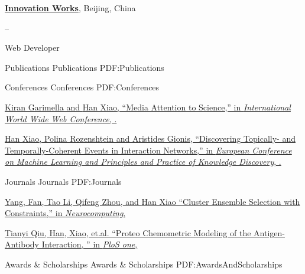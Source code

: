 \documentclass[letterpaper,MMMyyyy,nonstopmode]{simpleresumecv}
\begin{document}
\begin{Body}
\Entry
\href{http://www.example.com/my-company}
{\textbf{Innovation Works}}, Beijing, China

\hfill
{} --

\BulletItem
Web Developer


\Section
{Publications}
{Publications}
{PDF:Publications}

\BigGap
\SubSection
{Conferences}
{Conferences}
{PDF:Conferences}

\begingroup
\BigGap

\href{http://dl.acm.org/citation.cfm?id=3054215}
{Kiran Garimella and \underline{Han Xiao}, 
``Media Attention to Science,''
in \textit{International World Wide Web Conference},
.}

\BigGap

\href{https://arxiv.org/abs/1606.09446}
{\underline{Han Xiao}, Polina Rozenshtein and Aristides Gionis, 
``Discovering Topically- and Temporally-Coherent Events in Interaction Networks,''
in \textit{European Conference on Machine Learning and Principles and Practice of Knowledge Discovery},
.}

\endgroup

\BigGap

\SubSection
{Journals}
{Journals}
{PDF:Journals}

\begingroup

\BigGap

\href{http://www.sciencedirect.com/science/article/pii/S0925231217300024}
{Yang, Fan, Tao Li, Qifeng Zhou, and \underline{Han Xiao}
  ``Cluster Ensemble Selection with Constraints,''
  in \textit{Neurocomputing},
}

\BigGap

\href{http://journals.plos.org/plosone/article?id=10.1371/journal.pone.0122416}
{Tianyi Qiu, \underline{Han, Xiao}, et.al.
  ``Proteo Chemometric Modeling of the Antigen-Antibody Interaction, ''
  in \textit{PloS one},
  }


\endgroup



\Section
{Awards \&\newline
Scholarships}
{Awards \& Scholarships}
{PDF:AwardsAndScholarships}


\end{Body}
\end{document}
